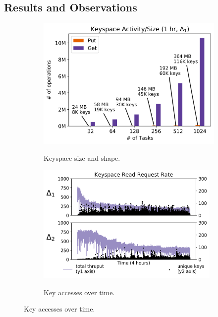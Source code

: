 \subsection{Results and Observations}
\label{sec:parsplice-keyspace-analysis}

\begin{figure}[t]
  \centering
  \begin{subfigure}[b]{.32\linewidth}
    \centering
    \includegraphics[width=1\textwidth]{figures/methodology-keyspace.png}\\
    \caption{Keyspace size and shape.
    \label{fig:methodology-keyspace}}
  \end{subfigure}
  \begin{subfigure}[b]{.32\linewidth}
    \includegraphics[width=0.975\textwidth]{figures/motivation-regimes.png}\\
    \caption{Key accesses over time.
}
\end{subfigure}
\end{figure}

